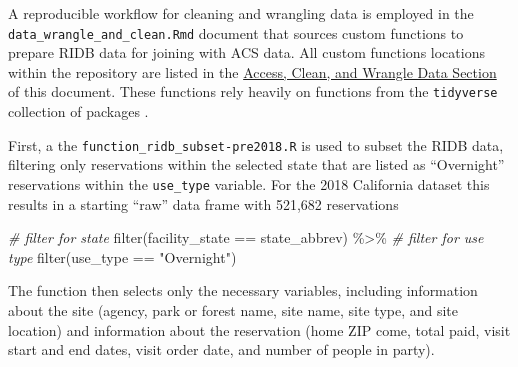 \documentclass[
]{book}
\newenvironment{Shaded}{\begin{snugshade}}{\end{snugshade}}
\newcommand{\CommentTok}[1]{\textcolor[rgb]{0.56,0.35,0.01}{\textit{#1}}}
\newcommand{\FunctionTok}[1]{\textcolor[rgb]{0.00,0.00,0.00}{#1}}
\newcommand{\NormalTok}[1]{#1}
\newcommand{\SpecialCharTok}[1]{\textcolor[rgb]{0.00,0.00,0.00}{#1}}
\newcommand{\StringTok}[1]{\textcolor[rgb]{0.31,0.60,0.02}{#1}}
\begin{document}
A reproducible workflow for cleaning and wrangling data is employed in the \texttt{data\_wrangle\_and\_clean.Rmd} document that sources custom functions to prepare RIDB data for joining with ACS data. All custom functions locations within the repository are listed in the \protect\hyperlink{access-clean-and-wrangle-data}{Access, Clean, and Wrangle Data Section} of this document. These functions rely heavily on functions from the \texttt{tidyverse} collection of packages \citep{R-tidyverse}.

First, a the \texttt{function\_ridb\_subset-pre2018.R} is used to subset the RIDB data, filtering only reservations within the selected state that are listed as ``Overnight'' reservations within the \texttt{use\_type} variable. For the 2018 California dataset this results in a starting ``raw'' data frame with 521,682 reservations

\begin{Shaded}
\begin{Highlighting}[]
\CommentTok{\# filter for state}
\FunctionTok{filter}\NormalTok{(facility\_state }\SpecialCharTok{==}\NormalTok{ state\_abbrev) }\SpecialCharTok{\%\textgreater{}\%}
  \CommentTok{\# filter for use type}
  \FunctionTok{filter}\NormalTok{(use\_type }\SpecialCharTok{==} \StringTok{"Overnight"}\NormalTok{)}
\end{Highlighting}
\end{Shaded}

The function then selects only the necessary variables, including information about the site (agency, park or forest name, site name, site type, and site location) and information about the reservation (home ZIP come, total paid, visit start and end dates, visit order date, and number of people in party).
\end{document}
